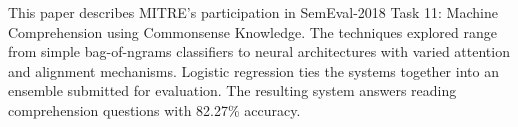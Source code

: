 This paper describes MITRE's participation in SemEval-2018 Task 11: Machine Comprehension using Commonsense Knowledge. The techniques explored range from simple bag-of-ngrams classifiers to neural architectures with varied attention and alignment mechanisms. Logistic regression ties the systems together into an ensemble submitted for evaluation. The resulting system answers reading comprehension questions with 82.27\% accuracy.

